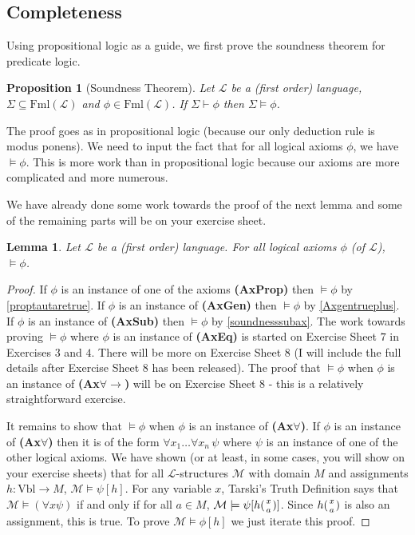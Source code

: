 \documentclass[11pt]{article}
\newcommand{\proves}{\vdash}
\newcommand{\Fml}{\textrm{Fml}}
\newcommand{\Vbl}{\textrm{Vbl}}
\newtheorem{proposition}[theorem]{Proposition}
\newtheorem{lemma}[theorem]{Lemma}
\newcommand{\mcal}[1]{\mathcal{#1}}
\begin{document}
\subsection{Completeness}

Using propositional logic as a guide, we first prove the soundness theorem for predicate logic.
\begin{proposition}[Soundness Theorem]
Let $\mcal{L}$ be a (first order) language, $\Sigma\subseteq \Fml(\mcal{L})$ and $\phi\in \Fml(\mcal{L})$. If $\Sigma\proves \phi$ then $\Sigma\models \phi$.
\end{proposition}
The proof goes as in propositional logic (because our only deduction rule is modus ponens). We need to input the fact that for all logical axioms $\phi$,  we have $\models \phi$. This is more work than in propositional logic because our axioms are more complicated and more numerous.


We have already done some work towards the proof of the next lemma and some of the remaining parts will be on your exercise sheet.
\begin{lemma}\label{SoundAxPred}
Let $\mcal{L}$ be a (first order) language. For all logical axioms $\phi$ (of $\mcal{L}$), $\models \phi$.
\end{lemma}
\begin{proof}
If $\phi$ is an instance of one of the axioms \textbf{(AxProp)} then $\models \phi$ by \ref{proptautaretrue}. If $\phi$ is an instance of \textbf{(AxGen)} then $\models \phi$ by \ref{Axgentrueplus}. If $\phi$ is an instance of \textbf{(AxSub)} then $\models \phi$ by \ref{soundnesssubax}. The work towards proving $\models \phi$ where $\phi$ is an instance of \textbf{(AxEq)} is started on Exercise Sheet $7$ in Exercises $3$ and $4$. There will be more on Exercise Sheet $8$ (I will include the full details after Exercise Sheet $8$ has been released). The proof that $\models \phi$ when $\phi$ is an instance of \textbf{(Ax$\forall\rightarrow$)} will be on Exercise Sheet $8$ - this is a relatively straightforward exercise.

It remains to show that $\models \phi$ when $\phi$ is an instance of \textbf{(Ax$\forall$)}. If $\phi$ is an instance of \textbf{(Ax$\forall$)} then it is of the form $\forall x_1\ldots\forall x_n \,\psi$ where $\psi$ is an instance of one of the other logical axioms. We have shown (or at least, in some cases, you will show on your exercise sheets) that for all $\mcal{L}$-structures $\mcal{M}$ with domain $M$ and assignments $h:\Vbl\rightarrow M$, $\mcal{M}\models \psi[h]$. For any variable $x$, Tarski's Truth Definition says that  $\mcal{M}\models (\forall x \psi)$ if and only if for all $a\in M$, $\mcal{M}\models \psi[h({x\atop a})]$. Since $h({x\atop a})$ is also an assignment, this is true. To prove $\mcal{M}\models \phi[h]$ we just iterate this proof.
\end{proof}
\end{document}
